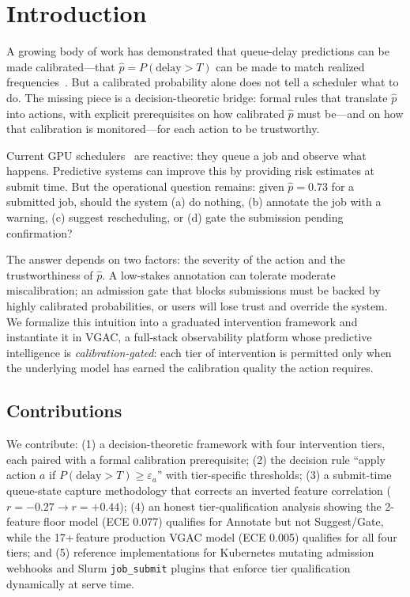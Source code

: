 \documentclass[sigconf]{acmart}
\begin{document}

\maketitle

\section{Introduction}
\label{sec:intro}
A growing body of work has demonstrated that queue-delay predictions can be made calibrated---that $\hat{p}=P(\text{delay} > T)$ can be made to match realized frequencies~\cite{guo2017calibration}. But a calibrated probability alone does not tell a scheduler what to do. The missing piece is a decision-theoretic bridge: formal rules that translate $\hat{p}$ into actions, with explicit prerequisites on how calibrated $\hat{p}$ must be---and on how that calibration is monitored---for each action to be trustworthy.

Current GPU schedulers~\cite{borg,firmament} are reactive: they queue a job and observe what happens. Predictive systems can improve this by providing risk estimates at submit time. But the operational question remains: given $\hat{p}=0.73$ for a submitted job, should the system (a) do nothing, (b) annotate the job with a warning, (c) suggest rescheduling, or (d) gate the submission pending confirmation?

The answer depends on two factors: the severity of the action and the trustworthiness of $\hat{p}$. A low-stakes annotation can tolerate moderate miscalibration; an admission gate that blocks submissions must be backed by highly calibrated probabilities, or users will lose trust and override the system. We formalize this intuition into a graduated intervention framework and instantiate it in VGAC, a full-stack observability platform whose predictive intelligence is \emph{calibration-gated}: each tier of intervention is permitted only when the underlying model has earned the calibration quality the action requires.

\subsection{Contributions}
We contribute: (1) a decision-theoretic framework with four intervention tiers, each paired with a formal calibration prerequisite; (2) the decision rule ``apply action $a$ if $P(\text{delay} > T) \ge \varepsilon_a$'' with tier-specific thresholds; (3) a submit-time queue-state capture methodology that corrects an inverted feature correlation ($r=-0.27 \to r=+0.44$); (4) an honest tier-qualification analysis showing the 2-feature floor model (ECE 0.077) qualifies for Annotate but not Suggest/Gate, while the 17+\,feature production VGAC model (ECE 0.005) qualifies for all four tiers; and (5) reference implementations for Kubernetes mutating admission webhooks and Slurm \texttt{job\_submit} plugins that enforce tier qualification dynamically at serve time.
\end{document}
